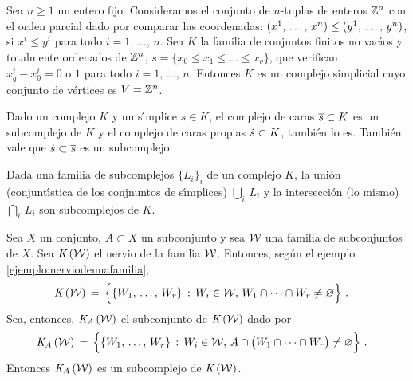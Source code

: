 \begin{ejemploReticulado}%
	\label{ejemplo:reticulado}
	Sea $n\geq 1$ un entero fijo. Consideramos el conjunto de $n$-tuplas
	de enteros $\bb{Z}^{n}$ con el orden parcial dado por comparar
	las coordenadas: $(\lista*{x}{n})\leq (\lista*{y}{n})$, si
	$x^{i}\leq y^{i}$ para todo $i=1,\,\dots,\,n$. Sea $K$ la familia de
	conjuntos finitos no vac\'{\i}os y totalmente ordenados de
	$\bb{Z}^{n}$, $s=\{x_{0}\leq x_{1}\leq\dots\leq x_{q}\}$, que
	verifican $x_{q}^{i}-x_{0}^{i}=0\text{ o }1$ para todo
	$i=1,\,\dots,\,n$. Entonces $K$ es un complejo simplicial cuyo
	conjunto de v\'{e}rtices es $V=\bb{Z}^{n}$.
\end{ejemploReticulado}

\begin{ejemploSubcomplejoDeCaras}\label{ejemplo:subcomplejodecaras}
	Dado un complejo $K$ y un s\'{\i}mplice $s\in K$,
	el complejo de caras $\caras{s}\subset K$ es un subcomplejo de $K$
	y el complejo de caras propias $\carasp{s}\subset K$, tambi\'{e}n lo
	es. Tambi\'{e}n vale que $\carasp{s}\subset\caras{s}$ es un
	subcomplejo.
\end{ejemploSubcomplejoDeCaras}

\begin{ejemploSubcomplejosUnionInterseccion}
	\label{ejemplo:subcomplejosunioninterseccion}
	Dada una familia de subcomplejos $\{L_{i}\}_{i}$ de un complejo
	$K$, la uni\'{o}n (conjunt\'{\i}stica de los conjnuntos de
	s\'{\i}mplices) $\bigcup_{i}\,L_{i}$ y la intersecci\'{o}n (lo
	mismo) $\bigcap_{i}\,L_{i}$ son subcomplejos de $K$.
\end{ejemploSubcomplejosUnionInterseccion}

\begin{ejemploSubcomplejoDelNervio}\label{ejemplo:subcomplejodelnervio}
	Sea $X$ un conjunto, $A\subset X$ un subconjunto y sea
	$\cal{W}$ una familia de subconjuntos de $X$. Sea $\nerv{\cal{W}}$
	el nervio de la familia $\cal{W}$. Entonces, seg\'{u}n el ejemplo
	\ref{ejemplo:nerviodeunafamilia},
	\begin{align*}
		\nerv{\cal{W}} & \,=\,
			\Big\{ \{\lista{W}{r}\}\,:\,
				W_{i}\in\cal{W},\,
				W_{1}\cap\cdots\cap W_{r}\not=\varnothing
			\Big\}
		\text{ .}
	\end{align*}
	Sea, entonces, $\nerv[A]{\cal{W}}$ el subconjunto de $\nerv{\cal{W}}$
	dado por
	\begin{align*}
		\nerv[A]{\cal{W}} & \,=\,
			\Big\{ \{\lista{W}{r}\}\,:\,
				W_{i}\in\cal{W},\,
				A\cap\big(W_{1}\cap\cdots\cap W_{r}\big)
					\not=\varnothing
			\Big\}
		\text{ .}
	\end{align*}
	Entonces $\nerv[A]{\cal{W}}$ es un subcomplejo de $\nerv{\cal{W}}$.
\end{ejemploSubcomplejoDelNervio}

